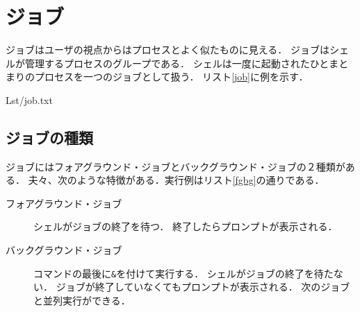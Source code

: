 


\section{ジョブ}
ジョブはユーザの視点からはプロセスとよく似たものに見える．
ジョブはシェルが管理するプロセスのグループである．
シェルは一度に起動されたひとまとまりのプロセスを一つのジョブとして扱う．
リスト\ref{job}に例を示す．


                {Lst/job.txt}

\subsection{ジョブの種類}
ジョブにはフォアグラウンド・ジョブとバックグラウンド・ジョブの２種類がある．
夫々、次のような特徴がある．実行例はリスト\ref{fgbg}の通りである．

\begin{description}
\item[フォアグラウンド・ジョブ]
シェルがジョブの終了を待つ．
終了したらプロンプトが表示される．

\item[バックグラウンド・ジョブ]
コマンドの最後に\texttt{\&}を付けて実行する．
シェルがジョブの終了を待たない．
ジョブが終了していなくてもプロンプトが表示される．
次のジョブと並列実行ができる．
\end{description}

